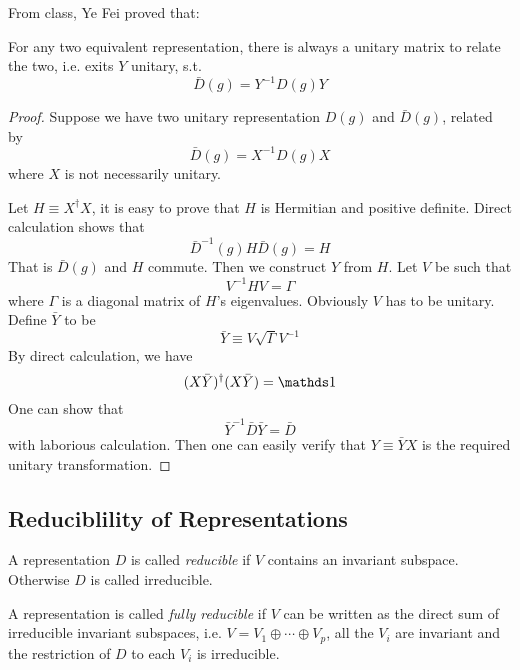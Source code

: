 From class, Ye Fei proved that:
\begin{thm}
    For any two equivalent representation, there is always a unitary
    matrix to relate the two, i.e. exits $Y$ unitary, s.t.
    $$ \bar{D}(g) = Y^{-1} D(g) Y$$
\end{thm}
\begin{proof}
    Suppose we have two unitary representation $D(g)$ and
    $\bar{D}(g)$, related by
    $$ \bar{D}(g) = X^{-1} D(g) X$$
    where $X$ is not necessarily unitary.

    Let $H\equiv X^\dagger X$, it is easy to prove that $H$ is
    Hermitian and positive definite. Direct calculation shows that
    $$ \bar{D}^{-1}(g) H \bar{D}(g) = H$$
    That is $\bar{D}(g)$ and $H$ commute.
    Then we construct $Y$ from $H$. Let $V$ be such that
    \begin{equation}
        V^{-1} H V = \Gamma
    \end{equation}
    where $\Gamma$ is a diagonal matrix of $H$'s eigenvalues.
    Obviously $V$ has to be unitary. Define $\bar{Y}$ to be
    \begin{equation}
        \bar{Y}\equiv V \sqrt{\Gamma} V^{-1}
    \end{equation}
    By direct calculation, we have
    $$ (X\bar{Y})^\dagger (X\bar{Y}) = \id$$
    One can show that
    $$ \bar{Y}^{-1} \bar{D} \bar{Y} = \bar{D}$$
    with laborious calculation. Then one can easily verify that
    $Y\equiv \bar{Y}X$ is the required unitary transformation.
\end{proof}

\subsection{Reduciblility of Representations}
\label{sec:Reduciblility-of-Representations}

\begin{defi}
    A representation $D$ is called \textit{reducible} if $V$ contains an
    invariant subspace. Otherwise $D$ is called irreducible.

    A representation is called \textit{fully reducible} if $V$ can be
    written as the direct sum of irreducible invariant subspaces, i.e.
    $V=V_1\oplus \cdots \oplus V_p$, all the $V_i$ are invariant and the
    restriction of $D$ to each $V_i$ is irreducible.
\end{defi}


